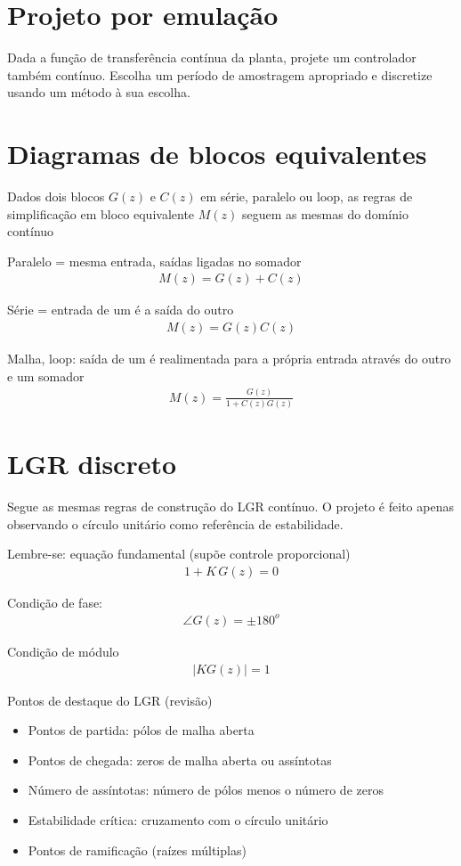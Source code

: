 \documentclass[12pt, a4paper]{article}
\begin{document}
\section{Projeto por emulação}

Dada a função de transferência contínua da planta, projete um controlador também contínuo. Escolha um período de amostragem apropriado e discretize usando um método à sua escolha.

\section{Diagramas de blocos equivalentes}

Dados dois blocos $G(z)$ e $C(z)$ em série, paralelo ou loop, as regras de simplificação em bloco equivalente $M(z)$ seguem as mesmas do domínio contínuo

Paralelo = mesma entrada, saídas ligadas no somador
\begin{align}
	M(z) = G(z) + C(z)
\end{align}

Série = entrada de um é a saída do outro
\begin{align}
	M(z) = G(z)C(z)
\end{align}

Malha, loop: saída de um é realimentada para a própria entrada através do outro e um somador
\begin{align}
	M(z) = \frac{G(z)}{1+C(z)G(z)}
\end{align}

\section{LGR discreto}

Segue as mesmas regras de construção do LGR contínuo. O projeto é feito apenas observando o círculo unitário como referência de estabilidade.

Lembre-se: equação fundamental (supõe controle proporcional)
\begin{align}
	1 + K\, G(z) = 0
\end{align}

Condição de fase:
\begin{align}
	\angle G(z) = \pm 180^o
\end{align}

Condição de módulo
\begin{align}
	|K G(z)| = 1
\end{align}

Pontos de destaque do LGR (revisão)
\begin{itemize}
	\item Pontos de partida: pólos de malha aberta
	\item Pontos de chegada: zeros de malha aberta ou assíntotas
	\item Número de assíntotas: número de pólos menos o número de zeros
	\item Estabilidade crítica: cruzamento com o círculo unitário
	\item Pontos de ramificação (raízes múltiplas)
\end{itemize}
\end{document}
